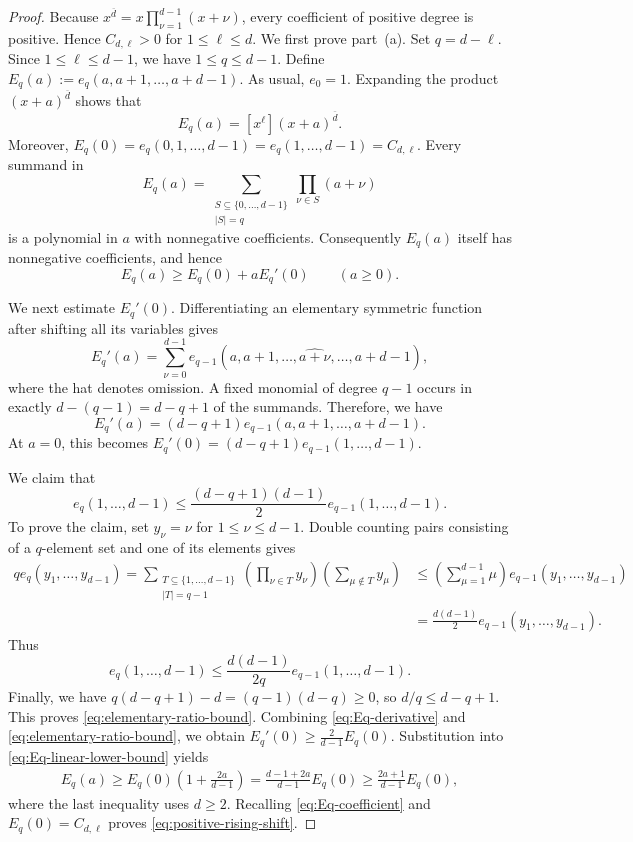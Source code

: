 \documentclass[reqno, 12pt]{article}
\numberwithin{equation}{section}
\theoremstyle{definition}
\begin{document}
\begin{proof}
Because $x^{\overline d}=x\prod_{\nu=1}^{d-1}(x+\nu)$, every coefficient of positive degree is positive.  Hence
$C_{d,\ell}>0$ for $1\leq\ell\leq d$.
We first prove part~(a).  Set $q=d-\ell$.  Since $1\leq\ell\leq d-1$, we have $1\leq q\leq d-1$.  Define
$E_q(a):=e_q(a,a+1,\ldots,a+d-1)$.
As usual, $e_0=1$. Expanding the product $(x+a)^{\overline d}$ shows that
\begin{equation}\label{eq:Eq-coefficient}
 E_q(a)=[x^\ell](x+a)^{\overline d}.
\end{equation}
Moreover, $E_q(0)=e_q(0,1,\ldots,d-1)=e_q(1,\ldots,d-1)=C_{d,\ell}$.
Every summand in
\[E_q(a)=\sum_{\substack{S\subseteq\{0,\ldots,d-1\}\\|S|=q}}\prod_{\nu\in S}(a+\nu)\]
is a polynomial in $a$ with nonnegative coefficients.  Consequently $E_q(a)$ itself has nonnegative coefficients, and hence
\begin{equation}\label{eq:Eq-linear-lower-bound}
 E_q(a)\geq E_q(0)+aE_q'(0)\qquad(a\geq0).
\end{equation}

We next estimate $E_q'(0)$.  Differentiating an elementary symmetric
function after shifting all its variables gives
\[E_q'(a)=\sum_{\nu=0}^{d-1}e_{q-1}(a,a+1,\ldots,\widehat{a+\nu},\ldots,a+d-1),
\]
where the hat denotes omission.  A fixed monomial of degree $q-1$
occurs in exactly $d-(q-1)=d-q+1$ of the summands.  Therefore, we have 
\begin{equation}\label{eq:Eq-derivative}
 E_q'(a)=(d-q+1)e_{q-1}(a,a+1,\ldots,a+d-1).
\end{equation}
At $a=0$, this becomes $E_q'(0)=(d-q+1)e_{q-1}(1,\ldots,d-1)$.

We claim that
\begin{equation}\label{eq:elementary-ratio-bound}
 e_q(1,\ldots,d-1)
 \leq\frac{(d-q+1)(d-1)}2e_{q-1}(1,\ldots,d-1).
\end{equation}
To prove the claim, set $y_\nu=\nu$ for $1\leq\nu\leq d-1$.
Double counting pairs consisting of a $q$-element set and one of its
elements gives
\begin{align*}
 q e_q(y_1,\ldots,y_{d-1})
=\sum_{\substack{T\subseteq\{1,\ldots,d-1\}\\|T|=q-1}}\left(\prod_{\nu\in T}y_\nu\right)\left(\sum_{\mu\notin T}y_\mu\right)
&\leq\left(\sum_{\mu=1}^{d-1}\mu\right)e_{q-1}(y_1,\ldots,y_{d-1})
\\& =\frac{d(d-1)}2e_{q-1}(y_1,\ldots,y_{d-1}).
\end{align*}
Thus
\[e_q(1,\ldots,d-1)\leq\frac{d(d-1)}{2q}e_{q-1}(1,\ldots,d-1).
\]
Finally, we have $q(d-q+1)-d=(q-1)(d-q)\geq0$, so $d/q\leq d-q+1$.  This proves \eqref{eq:elementary-ratio-bound}.
Combining \eqref{eq:Eq-derivative} and \eqref{eq:elementary-ratio-bound}, we obtain
$E_q'(0)\geq\frac2{d-1}E_q(0)$.
Substitution into \eqref{eq:Eq-linear-lower-bound} yields
\begin{align*}
E_q(a)\geq E_q(0)\left(1+\frac{2a}{d-1}\right)=\frac{d-1+2a}{d-1}E_q(0)\geq\frac{2a+1}{d-1}E_q(0),
\end{align*}
where the last inequality uses $d\geq2$.  Recalling \eqref{eq:Eq-coefficient} and $E_q(0)=C_{d,\ell}$ proves \eqref{eq:positive-rising-shift}.


\end{proof}
\end{document}
